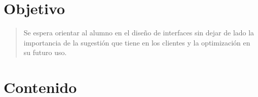 \documentclass[14pt]{article}
\begin{document}
    \newpage
    \cfoot[]{\thepage}
    \rfoot[]{}
    \large
    
    \vspace*{0.5cm}
    \section*{Objetivo}
    \begin{quote}
        Se espera orientar al alumno en el diseño de interfaces sin dejar de lado la importancia de la sugestión que tiene en los clientes y la optimización en su futuro uso.
    \end{quote}
    \vspace{1cm}
    \section*{Contenido}
\end{document}
